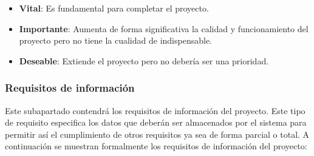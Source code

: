 \begin{itemize}
	\item \textbf{Vital}: Es fundamental para completar el proyecto.
	\item \textbf{Importante}: Aumenta de forma significativa la calidad y funcionamiento del proyecto pero no tiene la cualidad de indispensable.
	\item \textbf{Deseable}: Extiende el proyecto pero no debería ser una prioridad.
\end{itemize}


\subsubsection{Requisitos de información}

Este subapartado contendrá los requisitos de información del proyecto. Este tipo de requisito especifica los datos que deberán ser almacenados por el sistema para permitir así el cumplimiento de otros requisitos ya sea de forma parcial o total. A continuación se muestran formalmente los requisitos de información del proyecto:

\setcounter{contador_requisitos_de_informacion}{1}


